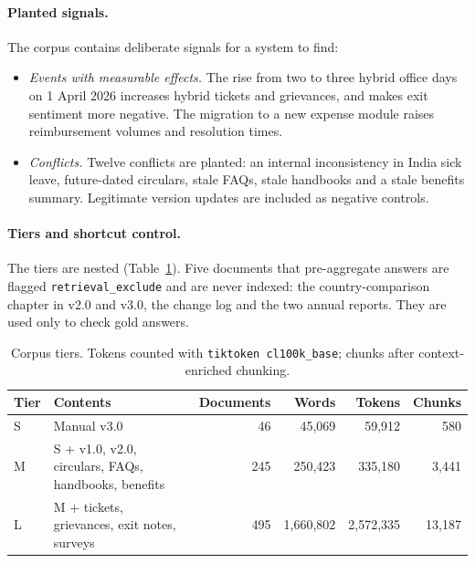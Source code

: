 \documentclass[11pt,letterpaper,oneside]{report}
\begin{document}
\paragraph{Planted signals.}
The corpus contains deliberate signals for a system to find:
\begin{itemize}
  \item \emph{Events with measurable effects.} The rise from two to three
  hybrid office days on 1 April 2026 increases hybrid tickets and grievances,
  and makes exit sentiment more negative. The migration to a new expense
  module raises reimbursement volumes and resolution times.
  \item \emph{Conflicts.} Twelve conflicts are planted: an internal
  inconsistency in India sick leave, future-dated circulars, stale FAQs,
  stale handbooks and a stale benefits summary. Legitimate version updates
  are included as negative controls.
\end{itemize}

\paragraph{Tiers and shortcut control.}
The tiers are nested (Table~\ref{tab:corpus}). Five documents that
pre-aggregate answers are flagged \texttt{retrieval\_exclude} and are never
indexed: the country-comparison chapter in v2.0 and v3.0, the change log and
the two annual reports. They are used only to check gold answers.

\begin{table}[htbp]
\centering\small
\caption{Corpus tiers. Tokens counted with \texttt{tiktoken cl100k\_base};
chunks after context-enriched chunking.}
\label{tab:corpus}
\begin{tabular}{@{}llrrrr@{}}
\toprule
Tier & Contents & Documents & Words & Tokens & Chunks \\
\midrule
S & Manual v3.0 & 46 & 45{,}069 & 59{,}912 & 580 \\
M & S + v1.0, v2.0, circulars, FAQs, handbooks, benefits & 245 & 250{,}423 & 335{,}180 & 3{,}441 \\
L & M + tickets, grievances, exit notes, surveys & 495 & 1{,}660{,}802 & 2{,}572{,}335 & 13{,}187 \\
\bottomrule
\end{tabular}
\end{table}
\end{document}
